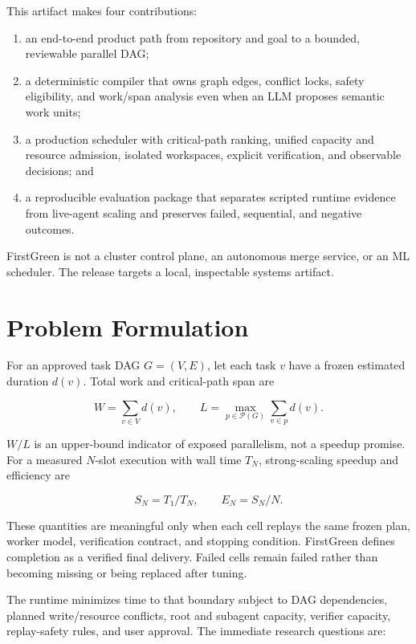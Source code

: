 \documentclass[10pt,twocolumn]{article}
\begin{document}
This artifact makes four contributions:

\begin{enumerate}
  \item an end-to-end product path from repository and goal to a bounded, reviewable parallel DAG;
  \item a deterministic compiler that owns graph edges, conflict locks, safety eligibility, and
        work/span analysis even when an LLM proposes semantic work units;
  \item a production scheduler with critical-path ranking, unified capacity and resource admission,
        isolated workspaces, explicit verification, and observable decisions; and
  \item a reproducible evaluation package that separates scripted runtime evidence from live-agent
        scaling and preserves failed, sequential, and negative outcomes.
\end{enumerate}

FirstGreen is not a cluster control plane, an autonomous merge service, or an ML scheduler. The
release targets a local, inspectable systems artifact.

\section{Problem Formulation}

For an approved task DAG $G=(V,E)$, let each task $v$ have a frozen estimated duration $d(v)$.
Total work and critical-path span are

\begin{equation}
  W=\sum_{v\in V}d(v), \qquad
  L=\max_{p\in\mathcal{P}(G)}\sum_{v\in p}d(v).
\end{equation}

$W/L$ is an upper-bound indicator of exposed parallelism, not a speedup promise. For a measured
$N$-slot execution with wall time $T_N$, strong-scaling speedup and efficiency are

\begin{equation}
  S_N=T_1/T_N, \qquad E_N=S_N/N.
\end{equation}

These quantities are meaningful only when each cell replays the same frozen plan, worker model,
verification contract, and stopping condition. FirstGreen defines completion as a verified final
delivery. Failed cells remain failed rather than becoming missing or being replaced after tuning.

The runtime minimizes time to that boundary subject to DAG dependencies, planned write/resource
conflicts, root and subagent capacity, verifier capacity, replay-safety rules, and user approval.
The immediate research questions are:
\end{document}
